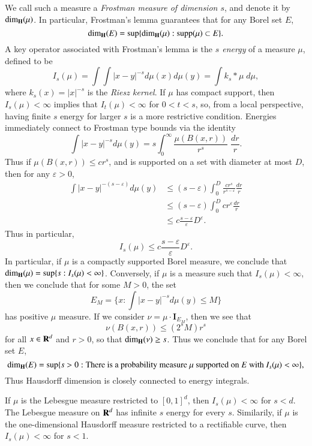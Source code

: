 We call such a measure a \emph{Frostman measure of dimension $s$}, and denote it by $\operatorname{\dim_{\mathbf{H}}}(\mu)$. In particular, Frostman's lemma guarantees that for any Borel set $E$,
%
\[ \operatorname{\dim_{\mathbf{H}}}(E) = \sup \{ \operatorname{\dim_{\mathbf{H}}}(\mu) : \text{supp}(\mu) \subset E \}. \]
%
A key operator associated with Frostman's lemma is the \emph{$s$ energy} of a measure $\mu$, defined to be
%
\[ I_s(\mu) = \int \int |x - y|^{-s} d\mu(x) d\mu(y) = \int k_s * \mu\; d\mu, \]
%
where $k_s(x) = |x|^{-s}$ is the \emph{Riesz kernel}. If $\mu$ has compact support, then $I_s(\mu) < \infty$ implies that $I_t(\mu) < \infty$ for $0 < t < s$, so, from a local perspective, having finite $s$ energy for larger $s$ is a more restrictive condition. Energies immediately connect to Frostman type bounds via the identity
%
\[ \int |x - y|^{-s} d\mu(y) = s \int_0^\infty \frac{\mu(B(x,r))}{r^s}\; \frac{dr}{r}. \]
%
Thus if $\mu(B(x,r)) \leq c r^s$, and is supported on a set with diameter at most $D$, then for any $\varepsilon > 0$,
%
\begin{align*}
  \int |x - y|^{-(s - \varepsilon)} d\mu(y) &\leq (s - \varepsilon) \int_0^D \frac{cr^s}{r^{s - \varepsilon}} \frac{dr}{r}\\
  &\leq (s - \varepsilon) \int_0^D c r^\varepsilon \frac{dr}{r}\\
  &\leq c \frac{s - \varepsilon}{\varepsilon} D^\varepsilon.
\end{align*}
%
Thus in particular,
%
\[ I_s(\mu) \leq c \frac{s - \varepsilon}{\varepsilon} D^\varepsilon. \]
%
In particular, if $\mu$ is a compactly supported Borel measure, we conclude that $\operatorname{\dim_{\mathbf{H}}}(\mu) = \sup \{ s : I_s(\mu) < \infty \}$. Conversely, if $\mu$ is a measure such that $I_s(\mu) < \infty$, then we conclude that for some $M > 0$, the set
%
\[ E_M = \{ x : \int |x - y|^{-s} d\mu(y) \leq M \} \]
%
has positive $\mu$ measure. If we consider $\nu = \mu \cdot \mathbf{I}_{E_M}$, then we see that
%
\[ \nu(B(x,r)) \leq (2^s M) r^s \]
%
for all $x \in \operatorname{\mathbf{R}}^d$ and $r > 0$, so that $\operatorname{\dim_{\mathbf{H}}}(\nu) \geq s$. Thus we conclude that for any Borel set $E$,
%
\[ \operatorname{\dim_{\mathbf{H}}}(E) = \sup \{ s > 0: \text{There is a probability measure $\mu$ supported on $E$ with $I_s(\mu) < \infty$} \}, \]
%
Thus Hausdorff dimension is closely connected to energy integrals.

\begin{example}
  If $\mu$ is the Lebesgue measure restricted to $[0,1]^d$, then $I_s(\mu) < \infty$ for $s < d$. The Lebesgue measure on $\operatorname{\mathbf{R}}^d$ has infinite $s$ energy for every $s$. Similarily, if $\mu$ is the one-dimensional Hausdorff measure restricted to a rectifiable curve, then $I_s(\mu) < \infty$ for $s < 1$.
\end{example}

